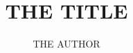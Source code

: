 \documentclass[
online,
]{uhull_dcs_thesis}
\title{THE TITLE}
\author{THE AUTHOR}
\date{}
\begin{document}
\frontmatter

\begin{spacing}{1}
  \maketitle
  
  \tableofcontents
\end{spacing}

\mainmatter







\backmatter

\begin{spacing}{1}
  
\end{spacing}
\end{document}
